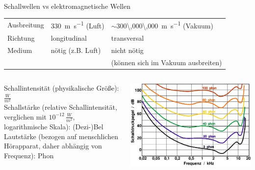\documentclass{beamer}
\begin{document}
\begin{frame}{Schallwellen vs elektromagnetische Wellen}
    
\begin{tabular}{|l|l|l|}
\hline
        & \color{theme}{\textbf{Schallwellen}}  & \color{theme}{\textbf{Elektromagnetische Wellen}}     \\
\hline
Ausbreitung       & \SI{330}{\meter\per\second} (Luft)  &  \(\sim\)\SI{300\,000\,000}{\meter\per\second} (Vakuum)   \\
\hline
Richtung        & longitudinal  & transversal   \\
\hline
Medium          & nötig (z.B. Luft)        & nicht nötig \\ 
&                       & (können sich im Vakuum ausbreiten)       \\[0.2 cm]
\hline
\end{tabular}

\pause


\begin{columns}[c]

\begin{column}{6cm}

Schallintensität (physikalische Größe): \(\frac{W}{m^2}\)  \\
\pause
Schallstärke (relative Schallintensität, verglichen mit \(10^{-12} \,\frac{W}{m^2}\), logarithmische Skala): (Dezi-)Bel \\
\pause
Lautstärke (bezogen auf menschlichen Hörapparat, daher abhängig von Frequenz): Phon \\ 

\end{column}

\begin{column}{5cm}
      \begin{center}
          \includegraphics[width=\textwidth]{Akustik_db2phon.jpg}
      \end{center}

\end{column}

\end{columns}
      
      
\end{frame}
\end{document}
